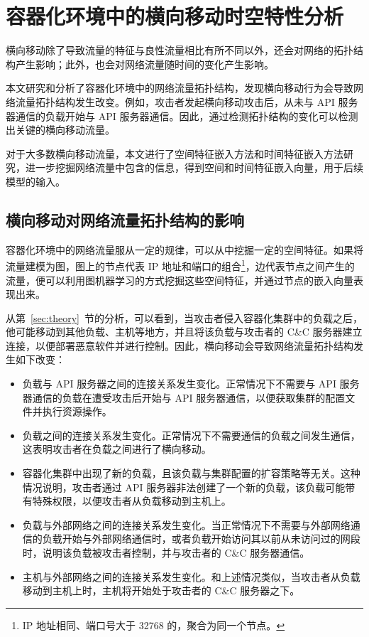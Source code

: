\chapter{容器化环境中的横向移动时空特性分析}{
{
\let\cleardoublepage\relax
}
\label{chap:embedding}


横向移动除了导致流量的特征与良性流量相比有所不同以外，还会对网络的拓扑结构产生影响；此外，也会对网络流量随时间的变化产生影响。

本文研究和分析了容器化环境中的网络流量拓扑结构，发现横向移动行为会导致网络流量拓扑结构发生改变。例如，攻击者发起横向移动攻击后，从未与 API 服务器通信的负载开始与 API 服务器通信。因此，通过检测拓扑结构的变化可以检测出关键的横向移动流量。

对于大多数横向移动流量，本文进行了空间特征嵌入方法和时间特征嵌入方法研究，进一步挖掘网络流量中包含的信息，得到空间和时间特征嵌入向量，用于后续模型的输入。

\section{横向移动对网络流量拓扑结构的影响}
\label{sec:topology}

容器化环境中的网络流量服从一定的规律，可以从中挖掘一定的空间特征。如果将流量建模为图，图上的节点代表 IP 地址和端口的组合\footnote{IP 地址相同、端口号大于 32768 的，聚合为同一个节点。}，边代表节点之间产生的流量，便可以利用图机器学习的方式挖掘这些空间特征，并通过节点的嵌入向量表现出来。

从第~\ref{sec:theory}~节的分析，可以看到，当攻击者侵入容器化集群中的负载之后，他可能移动到其他负载、主机等地方，并且将该负载与攻击者的 C\&C 服务器建立连接，以便部署恶意软件并进行控制。因此，横向移动会导致网络流量拓扑结构发生如下改变：

\begin{itemize}
    \item 负载与 API 服务器之间的连接关系发生变化。正常情况下不需要与 API 服务器通信的负载在遭受攻击后开始与 API 服务器通信，以便获取集群的配置文件并执行资源操作。
    \item 负载之间的连接关系发生变化。正常情况下不需要通信的负载之间发生通信，这表明攻击者在负载之间进行了横向移动。
    \item 容器化集群中出现了新的负载，且该负载与集群配置的扩容策略等无关。这种情况说明，攻击者通过 API 服务器非法创建了一个新的负载，该负载可能带有特殊权限，以便攻击者从负载移动到主机上。
    \item 负载与外部网络之间的连接关系发生变化。当正常情况下不需要与外部网络通信的负载开始与外部网络通信时，或者负载开始访问其以前从未访问过的网段时，说明该负载被攻击者控制，并与攻击者的 C\&C 服务器通信。
    \item 主机与外部网络之间的连接关系发生变化。和上述情况类似，当攻击者从负载移动到主机上时，主机将开始处于攻击者的 C\&C 服务器之下。
\end{itemize}

}
